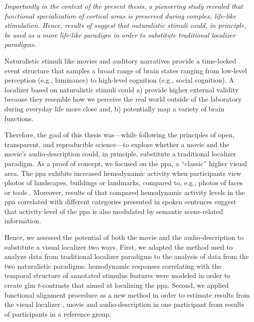 

\textit{Importantly in the context of the present thesis, a pioneering study
\citep{bartels2004mapping} revealed that functional specialization of cortical
areas is preserved during complex, life-like stimulation.
Hence, results of \citet{bartels2004mapping} suggest that naturalistic stimuli
could, in principle, be used as a more life-like paradigm in order to substitute
traditional localizer paradigms.}

Naturalistic stimuli like movies and auditory narratives \citep[cf.][for
reviews]{jaaskelainen2021movies, jaaskelainen2020neural} provide a time-locked
event structure that samples a broad range of brain states ranging from
low-level perception (e.g., luminance) to high-level cognition (e.g., social
cognition).
%
A localizer based on naturalistic stimuli could
%
a) provide higher external validity because they resemble how we perceive the
real world outside of the laboratory during everyday life more close and,
%
b) potentially map a variety of brain functions.

Therefore, the goal of this thesis was---while following the principles of open,
transparent, and reproducible science---to explore whether a movie and the
movie's audio-description could, in principle, substitute a traditional
localizer paradigm.
As a proof of concept, we focused on the \ac{ppa}, a ``classic'' higher visual
area.
%
The \ac{ppa} exhibits increased hemodynamic activity when participants view
photos of landscapes, buildings or landmarks, compared to, e.g., photos of faces
or tools \citep[e.g.,][for reviews]{epstein2014neural, aminoff2013role}.
%
Moreover, results of \citep{aziz2008modulation} that compared hemodynamic
activity levels in the \ac{ppa} correlated with different categories presented
in spoken sentences suggest that activity level of the \ac{ppa} is also
modulated by semantic scene-related information.

%
Hence, we assessed the potential of both the movie and the audio-description
to substitute a visual localizer two ways.
First, we adapted the method used to analyze data from traditional localizer
paradigms to the analysis of data from the two naturalistic paradigms:
%
hemodynamic responses correlating with the temporal structure of annotated
stimulus features \citep[cf.][]{haeusler2016cutanno, haeusler2021speechanno}
were modeled in order to create \ac{glm} $t$-contrasts that aimed at localizing
the \ac{ppa}.
Second, we applied functional alignment procedure as a new method in order to
estimate results from the visual localizer \citep[cf.][]{sengupta2016extension},
movie and audio-description \citep[cf.][]{haeusler2022processing} in one
participant from results of participants in a reference group.


